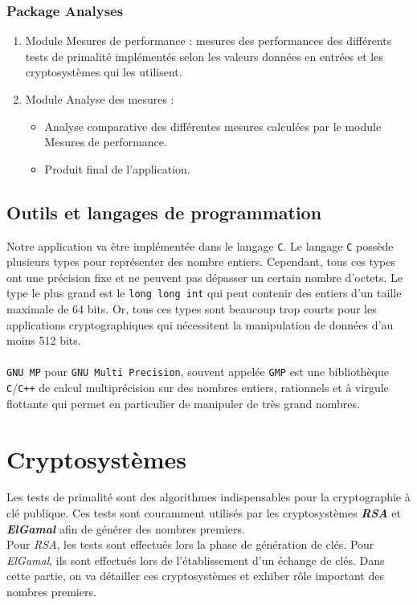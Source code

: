 				\subsubsection*{Package Analyses}
				\begin{enumerate}[leftmargin=*]
					\item Module Mesures de performance : mesures des performances des différents tests de primalité implémentés selon les valeurs données en entrées et les cryptosystèmes qui les utilisent.
					\item Module Analyse des mesures :
					\begin{itemize}[leftmargin=0.2cm]
						\item Analyse comparative des différentes mesures calculées par le module Mesures de performance.
						\item Produit final de l'application.
					\end{itemize}
				\end{enumerate}
		
		\subsection{Outils et langages de programmation}
		Notre application va être implémentée dans le langage \lstinline!C!. Le langage \lstinline!C! possède plusieurs types pour représenter des nombre entiers. Cependant, tous ces types ont une précision fixe et ne peuvent pas dépasser un certain nombre d'octets. Le type le plus grand est le \lstinline!long long int! qui peut contenir des entiers d'un taille maximale de 64 bits. Or, tous ces types sont beaucoup trop courts pour les applications cryptographiques qui nécessitent la manipulation de données d'au moins 512 bits.
		\paragraph{}\lstinline!GNU MP! pour \lstinline!GNU Multi Precision!, souvent appelée \lstinline!GMP! est une bibliothèque \lstinline!C!/\lstinline!C++! de calcul multiprécision sur des nombres entiers, rationnels et à virgule flottante qui permet en particulier de manipuler de très grand nombres.
	
	\section{Cryptosystèmes}
		Les tests de primalité sont des algorithmes indispensables pour la cryptographie à clé publique. Ces tests sont couramment utilisés par les cryptosystèmes \textbf{\textit{RSA}} et \textbf{\textit{ElGamal}} afin de générer des nombres premiers.\\
		Pour \textit{RSA}, les tests sont effectués lors la phase de génération de clés. Pour \textit{ElGamal}, ils sont effectués lors de l'établissement d'un échange de clés.
		Dans cette partie, on va détailler ces cryptosystèmes et exhiber rôle important des nombres premiers.
		

